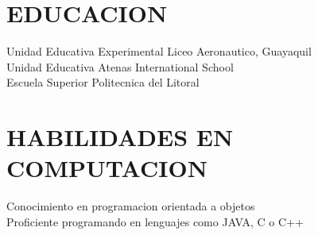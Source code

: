 \documentclass{res}
\begin{document}
 


\address{\bf  DOMICILIO ACTUAL\\Urbanizacion La Joya\\Guayquil, Ecuador\\(593) 42070702}
\address{\bf DOMICILIO PERMANENTE \\ Cdla. FAE Mz. 19 Villa 6 \\  Guayaquil, Ecuador\\  (593) 42397651}                                  
\begin{resume}
         
  
\section{EDUCACION}          
    Unidad Educativa Experimental Liceo Aeronautico, Guayaquil \\        
    Unidad Educativa Atenas International School   \\       
    Escuela Superior Politecnica del Litoral       \\ 
        
               


\section{HABILIDADES EN COMPUTACION}          
    Conocimiento en programacion orientada a objetos \\         
    Proficiente programando en lenguajes como JAVA, C o C++
 
 
       
 
\end{resume}
\end{document}
